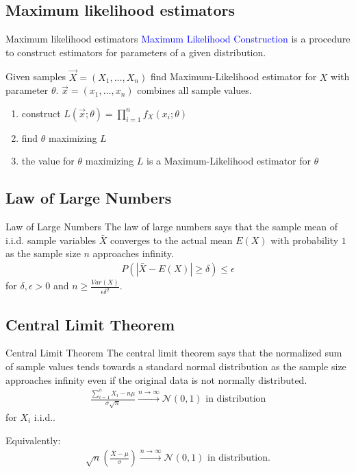 \documentclass{beamer}
\def\padding{\vspace{0.5cm}}
\def\spadding{\vspace{0.25cm}}
\def\b{\textcolor{blue}}
\begin{document}
\subsection{Maximum likelihood estimators}
\begin{frame}{Maximum likelihood estimators}
    \b{Maximum Likelihood Construction} is a procedure to construct estimators for parameters of a given distribution.\pause\par\padding
    Given samples $\overrightarrow{X} = (X_1, \dots, X_n)$ find Maximum-Likelihood estimator for $X$ with parameter $\theta$. $\overrightarrow{x} = (x_1, \dots, x_n)$ combines all sample values.
    \begin{enumerate}
        \item construct $L(\overrightarrow{x}; \theta) = \prod_{i=1}^n f_X(x_i; \theta)$
        \item find $\theta$ maximizing $L$
        \item the value for $\theta$ maximizing $L$ is a Maximum-Likelihood estimator for $\theta$
    \end{enumerate}
\end{frame}

\subsection{Law of Large Numbers}
\begin{frame}{Law of Large Numbers}
    The law of large numbers says that the sample mean of i.i.d. sample variables $\bar{X}$ converges to the actual mean $E(X)$ with probability $1$ as the sample size $n$ approaches infinity.\pause
    \begin{align*}
        P(|\bar{X} - E(X)| \geq \delta) \leq \epsilon
    \end{align*}
    for $\delta, \epsilon > 0$ and $n \geq \frac{Var(X)}{\epsilon \delta^2}$.
\end{frame}

\subsection{Central Limit Theorem}
\begin{frame}{Central Limit Theorem}
    The central limit theorem says that the normalized sum of sample values tends towards a standard normal distribution as the sample size approaches infinity even if the original data is not normally distributed.\pause
    \begin{align*}
        \frac{\sum_{i=1}^n X_i - n \mu}{\sigma \sqrt{n}} \xrightarrow{n \to \infty} \mathcal{N}(0,1) \text{ in distribution}
    \end{align*}
    for $X_i$ i.i.d..\pause\par\spadding
    Equivalently:
    \begin{align*}
        \sqrt{n} \left(\frac{\bar{X} - \mu}{\sigma}\right) \xrightarrow{n \to \infty} \mathcal{N}(0,1) \text{ in distribution}.
    \end{align*}
\end{frame}
\end{document}
